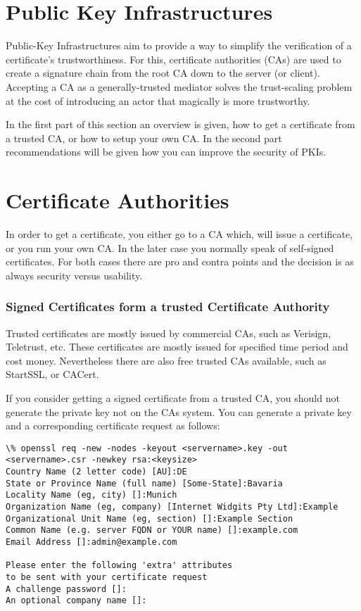 \section{Public Key Infrastructures}
\label{section:PKIs}

Public-Key Infrastructures aim to provide a way to simplify the verification of
a certificate's trustworthiness.  For this, certificate authorities (CAs) are
used to create a signature chain from the root CA down to the server (or client).
Accepting a CA as a generally-trusted mediator solves the trust-scaling problem
at the cost of introducing an actor that magically is more trustworthy.

In the first part of this section an overview is given, how to get a certificate from
a trusted CA, or how to setup your own CA. In the second part recommendations will be 
given how you can improve the security of PKIs.

\section{Certificate Authorities}
\label{sec:cas}
In order to get a certificate, you either go to a CA which, will issue a certificate,
or you run your own CA. In the later case you normally speak of self-signed 
certificates. For both cases there are pro and contra points and the decision is
as always security versus usability.

\subsubsection{Signed Certificates form a trusted Certificate Authority}
\label{sec:signcertfromca}
Trusted certificates are mostly issued by commercial CAs, such as Verisign, Teletrust, etc.
These certificates are mostly issued for specified time period and cost money. Nevertheless
there are also free trusted CAs available, such as StartSSL, or CACert.

If you consider getting a signed certificate from a trusted CA, you should not generate the 
private key not on the CAs system. You can generate a private key and a corresponding 
certificate request as follows:

\begin{lstlisting}[breaklines]
\% openssl req -new -nodes -keyout <servername>.key -out <servername>.csr -newkey rsa:<keysize>
Country Name (2 letter code) [AU]:DE
State or Province Name (full name) [Some-State]:Bavaria
Locality Name (eg, city) []:Munich
Organization Name (eg, company) [Internet Widgits Pty Ltd]:Example
Organizational Unit Name (eg, section) []:Example Section
Common Name (e.g. server FQDN or YOUR name) []:example.com
Email Address []:admin@example.com

Please enter the following 'extra' attributes
to be sent with your certificate request
A challenge password []:
An optional company name []:
\end{lstlisting}

